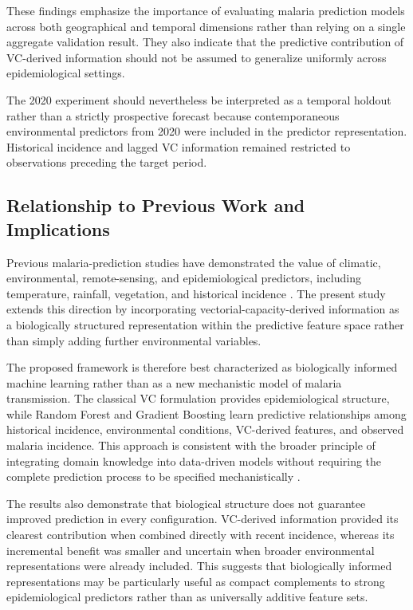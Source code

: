 \documentclass[10pt,twocolumn]{article}
\begin{document}
These findings emphasize the importance of evaluating malaria
prediction models across both geographical and temporal dimensions
rather than relying on a single aggregate validation result. They also
indicate that the predictive contribution of VC-derived information
should not be assumed to generalize uniformly across epidemiological
settings.

The 2020 experiment should nevertheless be interpreted as a temporal
holdout rather than a strictly prospective forecast because
contemporaneous environmental predictors from 2020 were included in
the predictor representation. Historical incidence and lagged VC
information remained restricted to observations preceding the target
period.


\subsection{Relationship to Previous Work and Implications}

Previous malaria-prediction studies have demonstrated the value of
climatic, environmental, remote-sensing, and epidemiological predictors,
including temperature, rainfall, vegetation, and historical incidence
\parencite{MafweleLee2022,Okiring2021,Cuellar2025,Odu2021,Masinde2020,Kaur2022}.
The present study extends this direction by incorporating
vectorial-capacity-derived information as a biologically structured
representation within the predictive feature space rather than simply
adding further environmental variables.

The proposed framework is therefore best characterized as biologically
informed machine learning rather than as a new mechanistic model of
malaria transmission. The classical VC formulation provides
epidemiological structure, while Random Forest and Gradient Boosting
learn predictive relationships among historical incidence,
environmental conditions, VC-derived features, and observed malaria
incidence. This approach is consistent with the broader principle of
integrating domain knowledge into data-driven models without requiring
the complete prediction process to be specified mechanistically
\parencite{Jhutty2022,Karpatne2024}.

The results also demonstrate that biological structure does not
guarantee improved prediction in every configuration. VC-derived
information provided its clearest contribution when combined directly
with recent incidence, whereas its incremental benefit was smaller and
uncertain when broader environmental representations were already
included. This suggests that biologically informed representations may
be particularly useful as compact complements to strong epidemiological
predictors rather than as universally additive feature sets.
\end{document}
